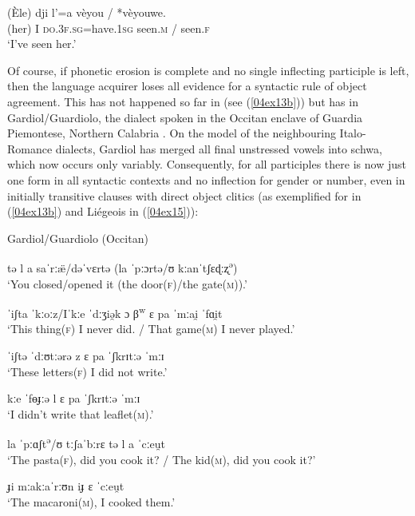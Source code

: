 \documentclass[output=paper,colorlinks,citecolor=brown]{langscibook}
\begin{document}
\begin{exe}
	\ex \label{04ex15}
	\gll (Èle) dji l’=a vèyou / *vèyouwe. \\
	(her) I \textsc{do.3f.sg}=have.\textsc{1sg} seen.\textsc{m} / seen.\textsc{f} \\
	\trans ‘I’ve seen her.’
\end{exe}

Of course, if phonetic erosion is complete and no single inflecting participle is left, then the language acquirer loses all evidence for a syntactic rule of object agreement. This has not happened so far in  (see (\ref{04ex13b})) but has in Gardiol/Guardiolo, the dialect spoken in the Occitan enclave of Guardia Piemontese, Northern Calabria \citep[183f.]{loporcaro1998}. On the model of the neighbouring Italo-Romance dialects, Gardiol has merged all final unstressed vowels into schwa, which now occurs only variably. Consequently, for all participles there is now just one form in all syntactic contexts and no inflection for gender or number, even in initially transitive clauses with direct object clitics (as exemplified for  in (\ref{04ex13b}) and Liégeois in (\ref{04ex15})):

\begin{exe}
	\ex \label{04ex16} Gardiol/Guardiolo (Occitan)
	\begin{xlist}
		\ex 
		tə l a saˈrːæ̈/dəˈvɛrtə (la ˈpːɔrtə/ʊ kːanˈtʃɛɖːʐ\textsuperscript{ə}) \\
		‘You closed/opened it (the door\textsc{(f)}/the gate\textsc{(m)}).’
		
		\ex 
		ˈiʃta ˈkːoːz/Iˈkːe ˈdːʒiə̯k ɔ β\textsuperscript{w} ɛ pa ˈmːai̯ ˈfɑi̯t \\
		‘This thing\textsc{(f)} I never did. / That game\textsc{(m)} I never played.’
		
		\ex 
		ˈiʃtə ˈdːʊtːərə z ɛ pa ˈʃkrɪtːə ˈmːɪ \\
		‘These letters\textsc{(f)} I did not write.’
		
		\ex 
		kːe ˈfɵɟːə l ɛ pa ˈʃkrɪtːə ˈmːɪ \\
		‘I didn’t write that leaflet\textsc{(m)}.’
		
		\ex 
		la ˈpːɑʃt\textsuperscript{ə}/ʊ tːʃaˈbːrɛ tə l a ˈcːeu̯t \\
		‘The pasta\textsc{(f)}, did you cook it? / The kid\textsc{(m)}, did you cook it?’
		
		\ex 
		ɟi mːakːaˈrːʊn iɟ ɛ ˈcːeu̯t \\
		‘The macaroni\textsc{(m)}, I cooked them.’
	\end{xlist}
\end{exe}
\end{document}
